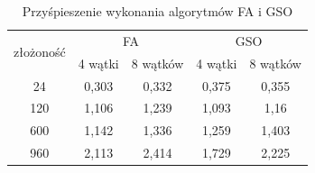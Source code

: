 \documentclass[11pt,a4paper,twoside]{article}
\begin{document}

\bgroup
\def\arraystretch{1.1}
\begin{table}[ht]
\caption{Przyśpieszenie wykonania algorytmów FA i GSO}
\label{MPprzysp}
\centering
\begin{tabular}{|c||c|c||c|c|}
\hline
 \multirow{2}{*}{złożoność} & \multicolumn{2}{c||}{FA} & \multicolumn{2}{c|}{GSO} \\\cline{2-5}
 & 4 wątki & 8 wątków & 4 wątki & 8 wątków \\\hline
 24 & 0,303 & 0,332 & 0,375 & 0,355\\\hline
 120 & 1,106 & 1,239 & 1,093 & 1,16 \\\hline
 600 & 1,142 & 1,336 & 1,259 & 1,403 \\\hline
 960 & 2,113 & 2,414 & 1,729 & 2,225 \\\hline
\end{tabular}
\end{table}
\egroup
\vspace*{1\baselineskip}
\end{document}
